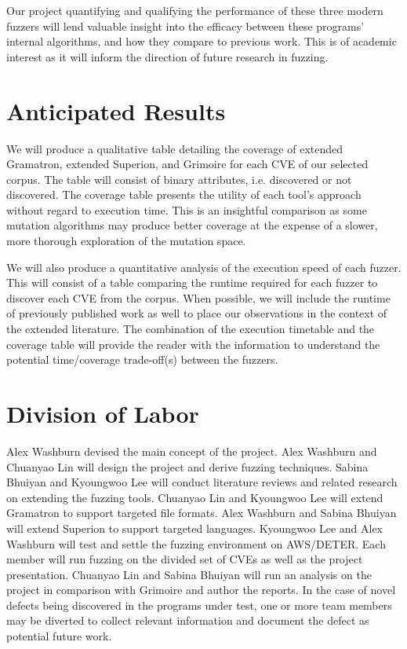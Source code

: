 \documentclass[12pt]{diazessay}
\begin{document}
Our project quantifying and qualifying the performance of these three modern fuzzers will lend valuable insight into the efficacy between these programs' internal algorithms, and how they compare to previous work.
This is of academic interest as it will inform the direction of future research in fuzzing.


\vspace{-0.25cm}
\section*{Anticipated Results}
\label{results}
\vspace{-0.25cm}

We will produce a qualitative table detailing the coverage of extended Gramatron, extended Superion, and Grimoire for each CVE of our selected corpus.
The table will consist of binary attributes, i.e. discovered or not discovered.
The coverage table presents the utility of each tool's approach without regard to execution time.
This is an insightful comparison as some mutation algorithms may produce better coverage at the expense of a slower, more thorough exploration of the mutation space.

We will also produce a quantitative analysis of the execution speed of each fuzzer.
This will consist of a table comparing the runtime required for each fuzzer to discover each CVE from the corpus.
When possible, we will include the runtime of previously published work as well to place our observations in the context of the extended literature.
The combination of the execution timetable and the coverage table will provide the reader with the information to understand the potential time/coverage trade-off(s) between the fuzzers.

\section*{Division of Labor}

Alex Washburn devised the main concept of the project.
Alex Washburn and Chuanyao Lin will design the project and derive fuzzing techniques.
Sabina Bhuiyan and Kyoungwoo Lee will conduct literature reviews and related research on extending the fuzzing tools.
Chuanyao Lin and Kyoungwoo Lee will extend Gramatron to support targeted file formats.
Alex Washburn and Sabina Bhuiyan will extend Superion to support targeted languages.
Kyoungwoo Lee and Alex Washburn will test and settle the fuzzing environment on AWS/DETER.
Each member will run fuzzing on the divided set of CVEs as well as the project presentation.
Chuanyao Lin and Sabina Bhuiyan will run an analysis on the project in comparison with Grimoire and author the reports.
In the case of novel defects being discovered in the programs under test, one or more team members may be diverted to collect relevant information and document the defect as potential future work.
\end{document}
